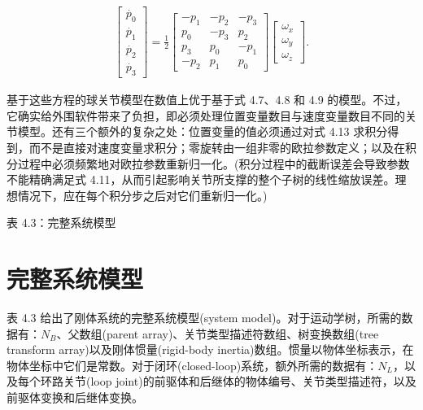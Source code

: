 \documentclass[10pt,a4paper]{book}
\theoremstyle{thmstyle} %
\theoremstyle{defstyle} %
\theoremstyle{prostyle} %
\begin{document}
$$
\begin{array}{r} { \left[ \begin{array}{l} { \dot { p _ { 0 } } } \\{ \dot { p _ { 1 } } } \\{ \dot { p _ { 2 } } } \\{ \dot { p _ { 3 } } } \end{array} \right] = \frac { 1 } { 2 } \left[ \begin{array}{lll} { - p _ { 1 } } & { - p _ { 2 } } & { - p _ { 3 } } \\{ p _ { 0 } } & { - p _ { 3 } } & { p _ { 2 } } \\{ p _ { 3 } } & { p _ { 0 } } & { - p _ { 1 } } \\{ - p _ { 2 } } & { p _ { 1 } } & { p _ { 0 } } \end{array} \right] \left[ \begin{array}{l} { \omega _ { x } } \\{ \omega _ { y } } \\{ \omega _ { z } } \end{array} \right] . } \end{array}
$$



基于这些方程的球关节模型在数值上优于基于式 4.7、4.8 和 4.9 的模型。不过，它确实给外围软件带来了负担，即必须处理位置变量数目与速度变量数目不同的关节模型。还有三个额外的复杂之处：位置变量的值必须通过对式 4.13 求积分得到，而不是直接对速度变量求积分；零旋转由一组非零的欧拉参数定义；以及在积分过程中必须频繁地对欧拉参数重新归一化。(积分过程中的截断误差会导致参数不能精确满足式 4.11，从而引起影响关节所支撑的整个子树的线性缩放误差。理想情况下，应在每个积分步之后对它们重新归一化。)



表 4.3：完整系统模型





\section{完整系统模型}





表 4.3 给出了刚体系统的完整系统模型(system model)。对于运动学树，所需的数据有：$N_{B}$、父数组(parent array)、关节类型描述符数组、树变换数组(tree transform array)以及刚体惯量(rigid-body inertia)数组。惯量以物体坐标表示，在物体坐标中它们是常数。对于闭环(closed-loop)系统，额外所需的数据有：$N_{L}$，以及每个环路关节(loop joint)的前驱体和后继体的物体编号、关节类型描述符，以及前驱体变换和后继体变换。
\end{document}

